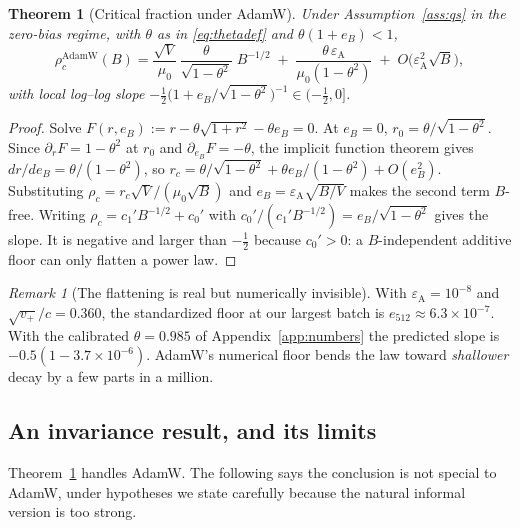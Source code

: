 \documentclass{article}
\theoremstyle{plain}
\newtheorem{theorem}{Theorem}
\theoremstyle{definition}
\theoremstyle{remark}
\newtheorem{remark}{Remark}
\newcommand{\1}{\mathbf{1}}
\newcommand{\Adam}{\mathrm{AdamW}}
\begin{document}
\begin{theorem}[Critical fraction under AdamW]
\label{thm:adamthreshold}
Under Assumption~\ref{ass:qs} in the zero-bias regime, with $\theta$ as in
\eqref{eq:thetadef} and $\theta(1+e_B) < 1$,
\begin{equation}
\label{eq:adamrhoc}
\rho_c^{\Adam}(B)
= \frac{\sqrt V}{\mu_0}\,\frac{\theta}{\sqrt{1-\theta^2}}\;B^{-1/2}
\;+\; \frac{\theta\,\varepsilon_{\mathrm A}}{\mu_0(1-\theta^2)}
\;+\; O\big(\varepsilon_{\mathrm A}^2\sqrt B\big),
\end{equation}
with local log--log slope
$-\tfrac12\big(1+e_B/\sqrt{1-\theta^2}\big)^{-1} \in (-\tfrac12,0]$.
\end{theorem}

\begin{proof}
Solve $F(r,e_B) := r-\theta\sqrt{1+r^2}-\theta e_B = 0$. At $e_B = 0$,
$r_0 = \theta/\sqrt{1-\theta^2}$. Since $\partial_rF = 1-\theta^2$ at $r_0$ and
$\partial_{e_B}F = -\theta$, the implicit function theorem gives
$dr/de_B = \theta/(1-\theta^2)$, so
$r_c = \theta/\sqrt{1-\theta^2}+\theta e_B/(1-\theta^2)+O(e_B^2)$. Substituting
$\rho_c = r_c\sqrt V/(\mu_0\sqrt B)$ and
$e_B = \varepsilon_{\mathrm A}\sqrt{B/V}$ makes the second term $B$-free.
Writing $\rho_c = c_1'B^{-1/2}+c_0'$ with
$c_0'/(c_1'B^{-1/2}) = e_B/\sqrt{1-\theta^2}$ gives the slope. It is negative and
larger than $-\tfrac12$ because $c_0' > 0$: a $B$-independent additive floor can
only flatten a power law.
\end{proof}

\begin{remark}[The flattening is real but numerically invisible]
\label{rem:epsnumeric}
With $\varepsilon_{\mathrm A} = 10^{-8}$ and $\sqrt{v_+}/c = 0.360$, the
standardized floor at our largest batch is $e_{512}\approx6.3\times10^{-7}$. With
the calibrated $\theta = 0.985$ of Appendix~\ref{app:numbers} the predicted slope
is $-0.5(1-3.7\times10^{-6})$. AdamW's numerical floor bends the law toward
\emph{shallower} decay by a few parts in a million.
\end{remark}

\subsection{An invariance result, and its limits}

Theorem~\ref{thm:adamthreshold} handles AdamW. The following says the conclusion
is not special to AdamW, under hypotheses we state carefully because the natural
informal version is too strong.
\end{document}

